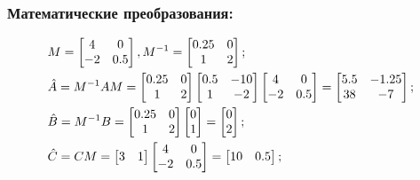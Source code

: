 \subsubsection{Математические преобразования:}
\begin{equation}
	\begin{split}	
		&M=\begin{bmatrix}
			4 & 0\\
			-2 & 0.5\\
		\end{bmatrix}, M^{-1}=\begin{bmatrix}
									0.25 & 0\\
									1 & 2\\
							  \end{bmatrix};\\
		&\Hat{A}=M^{-1}AM=\begin{bmatrix}
			0.25 & 0\\
			1 & 2\\
		\end{bmatrix} \begin{bmatrix}
			0.5 & -10\\
			1 & -2\\
		\end{bmatrix} \begin{bmatrix}
			4 & 0\\
			-2 & 0.5\\
		\end{bmatrix}=\begin{bmatrix}
			5.5 & -1.25\\
			38 & -7\\
		\end{bmatrix};\\
		&\Hat{B}=M^{-1}B=\begin{bmatrix}
			0.25 & 0\\
			1 & 2\\
		\end{bmatrix} \begin{bmatrix}
			0\\
			1\\
		\end{bmatrix}=\begin{bmatrix}
			0\\
			2\\
		\end{bmatrix};\\
		&\Hat{C}=CM=\begin{bmatrix}
			3 & 1\\
		\end{bmatrix} \begin{bmatrix}
			4 & 0\\
			-2 & 0.5\\
		\end{bmatrix}=\begin{bmatrix}
			10 & 0.5\\
		\end{bmatrix};\\
	\end{split}
\end{equation}

